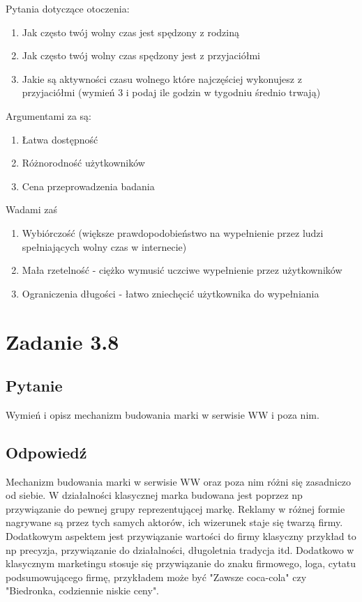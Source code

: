\documentclass[paper=a4, fontsize=11pt]{scrartcl} %
\numberwithin{equation}{section} %
\numberwithin{figure}{section} %
\numberwithin{table}{section} %
\begin{document}
Pytania dotyczące otoczenia:
\begin{enumerate}
  \item Jak często twój wolny czas jest spędzony z rodziną
  \item Jak często twój wolny czas spędzony jest z przyjaciółmi
  \item Jakie są aktywności czasu wolnego które najczęściej wykonujesz z przyjaciółmi (wymień 3 i podaj ile godzin w tygodniu średnio trwają)
\end{enumerate}


Argumentami za są:
\begin{enumerate}
  \item Łatwa dostępność
  \item Różnorodność użytkowników
  \item Cena przeprowadzenia badania
\end{enumerate}

Wadami zaś

\begin{enumerate}
  \item Wybiórczość (większe prawdopodobieństwo na wypełnienie przez ludzi spełniających wolny czas w internecie)
  \item Mała rzetelność - ciężko wymusić uczciwe wypełnienie przez użytkowników
  \item Ograniczenia długości - łatwo zniechęcić użytkownika do wypełniania
\end{enumerate}

\section{Zadanie 3.8}

\subsection {Pytanie}

Wymień i opisz mechanizm budowania marki w serwisie WW i poza nim.

\subsection {Odpowiedź}

Mechanizm budowania marki w serwisie WW oraz poza nim różni się zasadniczo od siebie.
W działalności klasycznej marka budowana jest poprzez np przywiązanie do pewnej grupy reprezentującej markę.
Reklamy w różnej formie nagrywane są przez tych samych aktorów, ich wizerunek staje się twarzą firmy.
Dodatkowym aspektem jest przywiązanie wartości do firmy klasyczny przykład to np precyzja, przywiązanie do
działalności, długoletnia tradycja itd. Dodatkowo w klasycznym marketingu stosuje się przywiązanie do
znaku firmowego, loga, cytatu podsumowującego firmę, przykładem może być "Zawsze coca-cola" czy 
"Biedronka, codziennie niskie ceny". 
\end{document}
